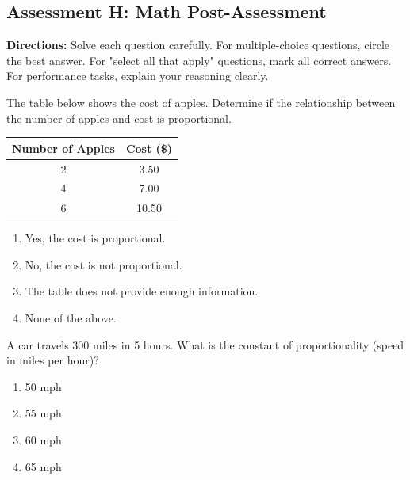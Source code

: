\documentclass[12pt]{article}
\begin{document}
\subsection*{Assessment H: Math Post-Assessment}
\onehalfspacing

\begin{tcolorbox}[colframe=black!50, colback=white, title=Assessment Directions]
\textbf{Directions:} Solve each question carefully. For multiple-choice questions, circle the best answer. For "select all that apply" questions, mark all correct answers. For performance tasks, explain your reasoning clearly.
\end{tcolorbox}

\begin{tcolorbox}[colframe=black!50, colback=white, title=\textbf{Problem 1 (7.RP.A.2a)}]
The table below shows the cost of apples. Determine if the relationship between the number of apples and cost is proportional.\\

\begin{center}
\begin{tabular}{|c|c|}
\hline
Number of Apples & Cost (\$) \\
\hline
2 & 3.50 \\
4 & 7.00 \\
6 & 10.50 \\
\hline
\end{tabular}
\end{center}

\begin{enumerate}[label=(\Alph*)]
    \item Yes, the cost is proportional.
    \item No, the cost is not proportional.
    \item The table does not provide enough information.
    \item None of the above.
\end{enumerate}
\end{tcolorbox}

\begin{tcolorbox}[colframe=black!50, colback=white, title=\textbf{Problem 2 (7.RP.A.2b)}]
A car travels 300 miles in 5 hours. What is the constant of proportionality (speed in miles per hour)?

\begin{enumerate}[label=(\Alph*)]
    \item 50 mph
    \item 55 mph
    \item 60 mph
    \item 65 mph
\end{enumerate}
\end{tcolorbox}
\end{document}
